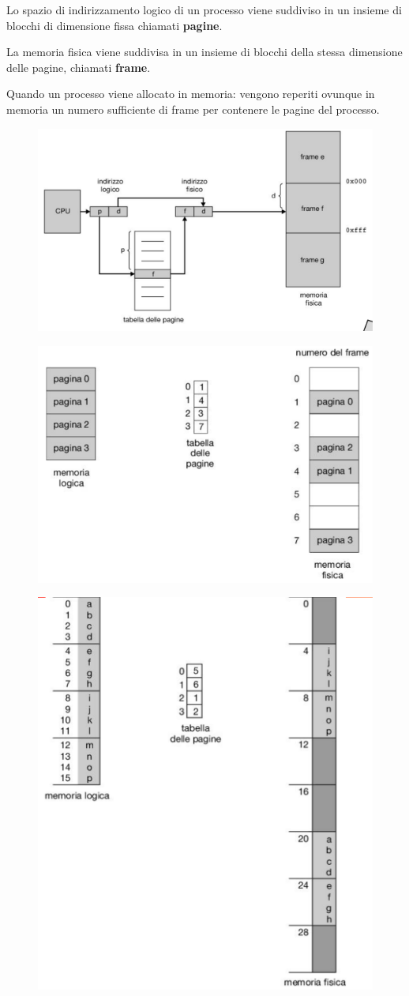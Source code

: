 Lo spazio di indirizzamento logico di un processo viene suddiviso in un insieme di blocchi di dimensione fissa chiamati
\textbf{pagine}.

La memoria fisica  viene suddivisa in un insieme di blocchi della stessa dimensione delle pagine, chiamati \textbf{frame}.

Quando un processo viene allocato in memoria: vengono reperiti ovunque in memoria un numero sufficiente di frame per contenere le pagine del processo.

\begin{figure} [h]
    \centering
    \includegraphics[width=0.7\linewidth]{Images/Screenshot 2025-01-17 at 15-53-05 so-05-memoria - so-05-memoria.pdf.png}
\end{figure}

\begin{figure} [h]
    \centering
    \includegraphics[width=0.7\linewidth]{Images/Screenshot 2025-01-17 at 15-54-41 so-05-memoria - so-05-memoria.pdf.png}
\end{figure}

\begin{figure} [h]
    \centering
    \includegraphics[width=0.5\linewidth]{Images/Screenshot 2025-01-17 at 15-56-06 so-05-memoria - so-05-memoria.pdf.png}
\end{figure}
\newpage

